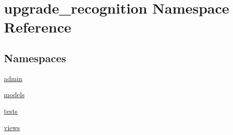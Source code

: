 \hypertarget{namespaceupgrade__recognition}{\section{upgrade\-\_\-recognition Namespace Reference}
\label{namespaceupgrade__recognition}
}
\subsection*{Namespaces}
\begin{DoxyCompactItemize}
\item 
\hyperlink{namespaceupgrade__recognition_1_1admin}{admin}
\item 
\hyperlink{namespaceupgrade__recognition_1_1models}{models}
\item 
\hyperlink{namespaceupgrade__recognition_1_1tests}{tests}
\item 
\hyperlink{namespaceupgrade__recognition_1_1views}{views}
\end{DoxyCompactItemize}
